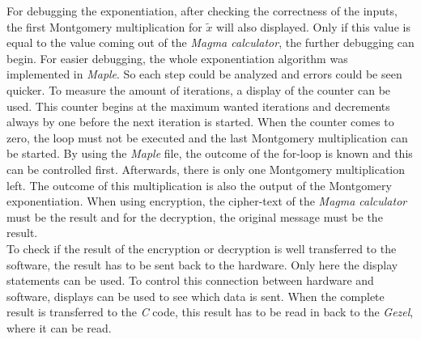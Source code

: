 \documentclass[a4paper]{article}
\begin{document}
For debugging the exponentiation, after checking the correctness of the inputs, the first Montgomery multiplication for $\tilde{x}$ will also displayed. Only if this value is equal to the value coming out of the \textit{Magma calculator}, the further debugging can begin. For easier debugging, the whole exponentiation algorithm was implemented in \textit{Maple}. So each step could be analyzed and errors could be seen quicker. To measure the amount of iterations, a display of the counter can be used. This counter begins at the maximum wanted iterations and decrements always by one before the next iteration is started. When the counter comes to zero, the loop must not be executed and the last Montgomery multiplication can be started. By using the \textit{Maple} file, the outcome of the for-loop is known and this can be controlled first. Afterwards, there is only one Montgomery multiplication left. The outcome of this multiplication is also the output of the Montgomery exponentiation. When using encryption, the cipher-text of the \textit{Magma calculator} must be the result and for the decryption, the original message must be the result.\\

To check if the result of the encryption or decryption is well transferred to the software, the result has to be sent back to the hardware. Only here the display statements can be used. To control this connection between hardware and software, displays can be used to see which data is sent. When the complete result is transferred to the \textit{C} code, this result has to be read in back to the \textit{Gezel}, where it can be read.
\end{document}
